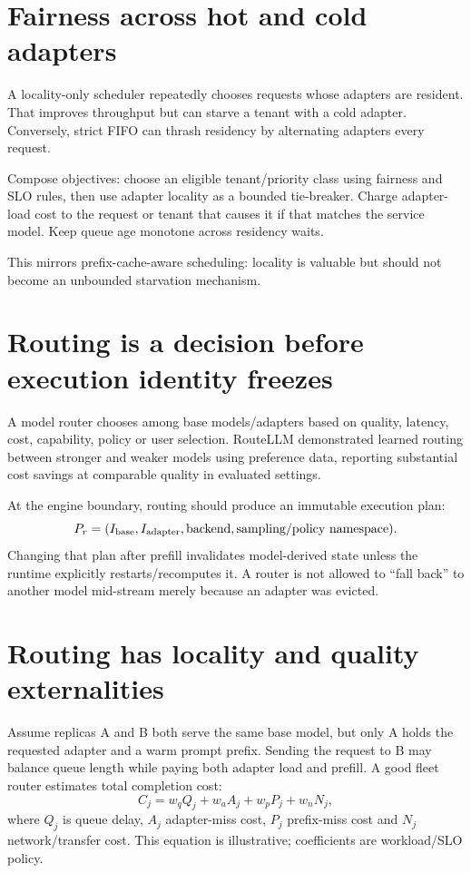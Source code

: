 \section{Fairness across hot and cold adapters}

A locality-only scheduler repeatedly chooses requests whose adapters are resident.
That improves throughput but can starve a tenant with a cold adapter. Conversely,
strict FIFO can thrash residency by alternating adapters every request.

Compose objectives: choose an eligible tenant/priority class using fairness and SLO
rules, then use adapter locality as a bounded tie-breaker. Charge adapter-load cost to
the request or tenant that causes it if that matches the service model. Keep queue age
monotone across residency waits.

This mirrors prefix-cache-aware scheduling: locality is valuable but should not become
an unbounded starvation mechanism.

\section{Routing is a decision before execution identity freezes}

A model router chooses among base models/adapters based on quality, latency, cost,
capability, policy or user selection. RouteLLM demonstrated learned routing between
stronger and weaker models using preference data, reporting substantial cost savings
at comparable quality in evaluated settings. \cite{ong2024routellm}

At the engine boundary, routing should produce an immutable execution plan:
\[
P_r=(I_{\rm base},I_{\rm adapter},\text{backend},\text{sampling/policy namespace}).
\]
Changing that plan after prefill invalidates model-derived state unless the runtime
explicitly restarts/recomputes it. A router is not allowed to ``fall back'' to another
model mid-stream merely because an adapter was evicted.

\section{Routing has locality and quality externalities}

Assume replicas A and B both serve the same base model, but only A holds the requested
adapter and a warm prompt prefix. Sending the request to B may balance queue length
while paying both adapter load and prefill. A good fleet router estimates total
completion cost:
\[
C_j=w_q Q_j+w_a A_j+w_p P_j+w_n N_j,
\]
where $Q_j$ is queue delay, $A_j$ adapter-miss cost, $P_j$ prefix-miss cost and $N_j$
network/transfer cost. This equation is illustrative; coefficients are workload/SLO
policy.

